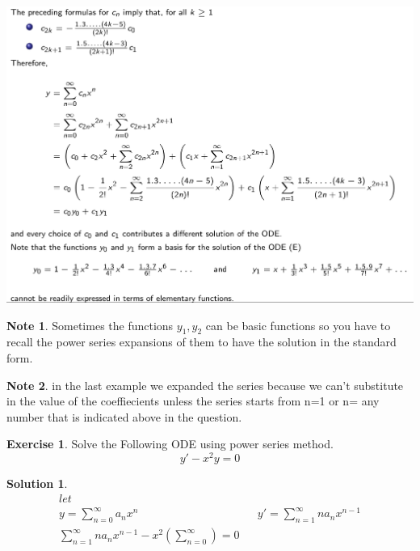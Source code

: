 \documentclass[11pt]{article}
\theoremstyle{definition}
\newtheorem{exer}{Exercise}
\newtheorem{sln}{Solution}
\newtheorem{note}{Note}
\begin{document}
\includegraphics[scale=0.5]{images/img4.png}
\begin{note}
Sometimes the functions $y_1,y_2$ can be basic functions so you have to recall the power series expansions of them to have the solution in the standard form.
\end{note}
\begin{note}
in the last example we expanded the series because we can't substitute in the value of the coeffiecients unless the series starts from n=1 or n= any number that is indicated above in the question.
\end{note}
\begin{exer}
Solve the Following ODE using power series method. 
\begin{equation}
y' - x^2y = 0
\end{equation}
\end{exer}
\begin{sln}

\begin{align}
	let\\ y = \sum_{n=0}^{\infty}a_n x^n && y' = \sum_{n=1}^{\infty} na_nx^{n-1} \\
	\sum_{n=1}^{\infty} na_nx^{n-1} - x^2 (\sum_{n=0}^{\infty}) = 0\\
\end{align}

\end{sln}
\end{document}
